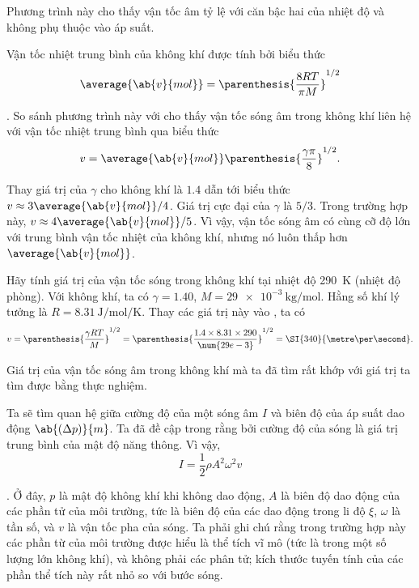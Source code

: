 \noindent
Phương trình này cho thấy vận tốc âm tỷ lệ với căn bậc hai của nhiệt độ và không phụ thuộc vào áp suất.

Vận tốc nhiệt trung bình của không khí được tính bởi biểu thức
\begin{equation*}
	\average{\ab{v}{mol}} = \parenthesis{\frac{8RT}{\pi M}}^{1/2}
\end{equation*}

.
So sánh phương trình này với  cho thấy vận tốc sóng âm trong không khí liên hệ với vận tốc nhiệt trung bình qua biểu thức
\begin{equation}\label{eq:14_71}
	v = \average{\ab{v}{mol}} \parenthesis{\frac{\gamma\pi}{8}}^{1/2}.
\end{equation}

\noindent
Thay giá trị của $\gamma$ cho không khí là $1.4$ dẫn tới biểu thức $v\approx 3\average{\ab{v}{mol}}/4$.
Giá trị cực đại của $\gamma$ là $5/3$.
Trong trường hợp này, $v\approx 4\average{\ab{v}{mol}}/5$.
Vì vậy, vận tốc sóng âm có cùng cỡ độ lớn với trung bình vận tốc nhiệt của không khí, nhưng nó luôn thấp hơn $\average{\ab{v}{mol}}$.

Hãy tính giá trị của vận tốc sóng trong không khí tại nhiệt độ \SI{290}{\kelvin} (nhiệt độ phòng).
Với không khí, ta có $\gamma=1.40$, $M=\SI{29e-3}{\kilo\gram\per\mole}$.
Hằng số khí lý tưởng là $R=\SI{8.31}{\joule\per\mole\per\kelvin}$.
Thay các giá trị này vào , ta có
\begin{equation*}
	v = \parenthesis{\frac{\gamma RT}{M}}^{1/2} = \parenthesis{\frac{1.4\times 8.31 \times 290}{\num{29e-3}}}^{1/2} = \SI{340}{\metre\per\second}.
\end{equation*}

\noindent
Giá trị của vận tốc sóng âm trong không khí mà ta đã tìm rất khớp với giá trị ta tìm được bằng thực nghiệm.

Ta sẽ tìm quan hệ giữa cường độ của một sóng âm $I$ và biên độ của áp suất dao động $\ab{(\Delta{p})}{m}$.
Ta đã đề cập trong  rằng bởi cường độ của sóng là giá trị trung bình của mật độ năng thông.
Vì vậy,
\begin{equation}\label{eq:14_72}
	I = \frac{1}{2} \rho A^2 \omega^2 v
\end{equation}

.
Ở đây, $p$ là mật độ không khí khi không dao động, $A$ là biên độ dao động của các phần tử của môi trường, tức là biên độ của các dao động trong li độ $\xi$, $\omega$ là tần số, và $v$ là vận tốc pha của sóng.
Ta phải ghi chú rằng trong trường hợp này các phần từ của môi trường được hiểu là thể tích vĩ mô (tức là trong một số lượng lớn không khí), và không phải các phân tử; kích thước tuyến tính của các phần thể tích này rất nhỏ so với bước sóng.

